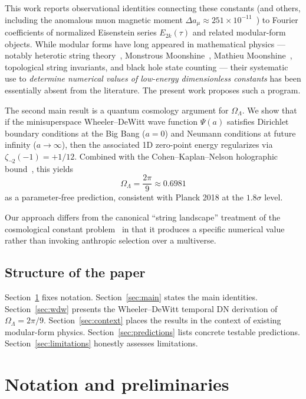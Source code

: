 \documentclass[11pt,a4paper]{article}
\begin{document}
This work reports observational identities connecting these
constants (and others, including the anomalous muon magnetic moment
$\Delta a_\mu \approx 251 \times 10^{-11}$~\cite{MuonG2FNAL}) to
Fourier coefficients of normalized Eisenstein series $E_{2k}(\tau)$
and related modular-form objects. While modular forms have long
appeared in mathematical physics --- notably heterotic string
theory~\cite{GSW1987}, Monstrous Moonshine~\cite{Borcherds1992},
Mathieu Moonshine~\cite{EOT2010}, topological string invariants,
and black hole state counting --- their systematic use to
\emph{determine numerical values of low-energy dimensionless
constants} has been essentially absent from the literature. The
present work proposes such a program.

The second main result is a quantum cosmology argument for
$\Omega_\Lambda$. We show that if the minisuperspace Wheeler--DeWitt
wave function $\Psi(a)$ satisfies Dirichlet boundary conditions at
the Big Bang ($a = 0$) and Neumann conditions at future infinity
($a \to \infty$), then the associated 1D zero-point energy
regularizes via $\zeta_{\neg 2}(-1) = +1/12$. Combined with the
Cohen--Kaplan--Nelson holographic bound~\cite{CKN1999}, this yields
\begin{equation}
\Omega_\Lambda = \frac{2\pi}{9} \approx 0.6981
\end{equation}
as a parameter-free prediction, consistent with Planck 2018 at
the $1.8\sigma$ level.

Our approach differs from the canonical ``string landscape''
treatment of the cosmological constant problem~\cite{Susskind2003}
in that it produces a specific numerical value rather than
invoking anthropic selection over a multiverse.

\subsection{Structure of the paper}

Section~\ref{sec:notation} fixes notation. Section~\ref{sec:main}
states the main identities. Section~\ref{sec:wdw} presents the
Wheeler--DeWitt temporal DN derivation of $\Omega_\Lambda = 2\pi/9$.
Section~\ref{sec:context} places the results in the context of
existing modular-form physics. Section~\ref{sec:predictions} lists
concrete testable predictions. Section~\ref{sec:limitations}
honestly assesses limitations.

\section{Notation and preliminaries}
\label{sec:notation}
\end{document}
